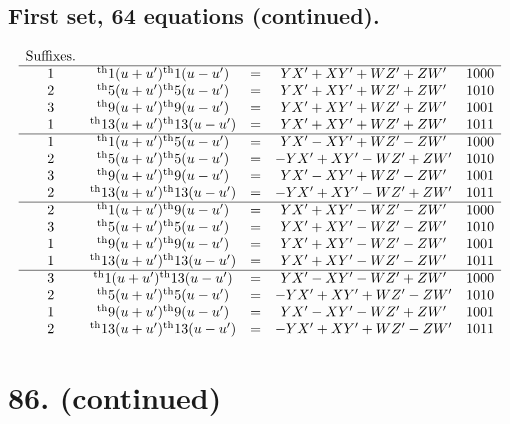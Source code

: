 \documentclass[11pt,a4paper]{book}
\providecommand{\uth}{\textsuperscript{th}}
\begin{document}
\subsection*{First set, 64 equations (continued).}

\[
\begin{array}{ccccc}
\text{Suffixes.} & & & & \\
\hline
1 & \uth{1}(u+u')\uth{1}(u-u') &=& YX' + XY' + WZ' + ZW' & 1000 \\
2 & \uth{5}(u+u')\uth{5}(u-u') &=& YX' + XY' + WZ' + ZW' & 1010 \\
3 & \uth{9}(u+u')\uth{9}(u-u') &=& YX' + XY' + WZ' + ZW' & 1001 \\
1 & \uth{13}(u+u')\uth{13}(u-u') &=& YX' + XY' + WZ' + ZW' & 1011 \\
\hline
1 & \uth{1}(u+u')\uth{5}(u-u') &=& YX' - XY' + WZ' - ZW' & 1000 \\
2 & \uth{5}(u+u')\uth{5}(u-u') &=& -YX' + XY' - WZ' + ZW' & 1010 \\
3 & \uth{9}(u+u')\uth{9}(u-u') &=& YX' - XY' + WZ' - ZW' & 1001 \\
2 & \uth{13}(u+u')\uth{13}(u-u') &=& -YX' + XY' - WZ' + ZW' & 1011 \\
\hline
2 & \uth{1}(u+u')\uth{9}(u-u') &=& YX' + XY' - WZ' - ZW' & 1000 \\
3 & \uth{5}(u+u')\uth{5}(u-u') &=& YX' + XY' - WZ' - ZW' & 1010 \\
1 & \uth{9}(u+u')\uth{9}(u-u') &=& YX' + XY' - WZ' - ZW' & 1001 \\
1 & \uth{13}(u+u')\uth{13}(u-u') &=& YX' + XY' - WZ' - ZW' & 1011 \\
\hline
3 & \uth{1}(u+u')\uth{13}(u-u') &=& YX' - XY' - WZ' + ZW' & 1000 \\
2 & \uth{5}(u+u')\uth{5}(u-u') &=& -YX' + XY' + WZ' - ZW' & 1010 \\
1 & \uth{9}(u+u')\uth{9}(u-u') &=& YX' - XY' - WZ' + ZW' & 1001 \\
2 & \uth{13}(u+u')\uth{13}(u-u') &=& -YX' + XY' + WZ' - ZW' & 1011
\end{array}
\]

\newpage
\section*{86. (continued)}
\label{sec:86cont2}
\end{document}
